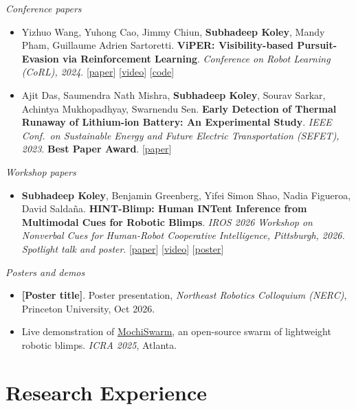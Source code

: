 \documentclass[10pt,letterpaper]{article}
\newcommand{\pub}[4]{%
  \item #1. \textbf{#2}. \textit{#3}. #4}
\newcommand{\me}{\textbf{Subhadeep Koley}}
\begin{document}
\textit{Conference papers}
\begin{itemize}
  \pub{Yizhuo Wang, Yuhong Cao, Jimmy Chiun, \me, Mandy Pham, Guillaume Adrien Sartoretti}
      {ViPER: Visibility-based Pursuit-Evasion via Reinforcement Learning}
      {Conference on Robot Learning (CoRL), 2024}
      {[\href{https://openreview.net/forum?id=EPujQZWemk}{paper}] [\href{https://www.youtube.com/watch?v=r2SurmnPKuA}{video}] [\href{https://github.com/marmotlab/ViPER}{code}]}
  \pub{Ajit Das, Saumendra Nath Mishra, \me, Sourav Sarkar, Achintya Mukhopadhyay, Swarnendu Sen}
      {Early Detection of Thermal Runaway of Lithium-ion Battery: An Experimental Study}
      {IEEE Conf.\ on Sustainable Energy and Future Electric Transportation (SEFET), 2023}
      {\textbf{Best Paper Award}. [\href{https://doi.org/10.1109/SEFET57834.2023.10245991}{paper}]}
\end{itemize}

\textit{Workshop papers}
\begin{itemize}
  \pub{\me, Benjamin Greenberg, Yifei Simon Shao, Nadia Figueroa, David Salda\~na}
      {HINT-Blimp: Human INTent Inference from Multimodal Cues for Robotic Blimps}
      {IROS 2026 Workshop on Nonverbal Cues for Human-Robot Cooperative Intelligence, Pittsburgh, 2026.
       Spotlight talk and poster}
      {[\href{https://nocworkshop.github.io/2026-IROS/resources/15/Camera_ready_HintBlimp_IROS_NoC_workshop.pdf}{paper}]
       [\href{https://www.youtube.com/watch?v=P_ZU_f_-qek}{video}]
       [\href{https://nocworkshop.github.io/2026-IROS/resources/15/IROS_workshop_poster.pdf}{poster}]}
\end{itemize}

\textit{Posters and demos}
\begin{itemize}
  \item \textbf{[Poster title]}. Poster presentation, \textit{Northeast Robotics Colloquium (NERC)},
        Princeton University, Oct 2026.
  \item Live demonstration of \href{https://ieeexplore.ieee.org/document/11127424}{MochiSwarm}, an open-source swarm of lightweight robotic blimps. \textit{ICRA 2025}, Atlanta.
\end{itemize}

\section{Research Experience}
\end{document}
